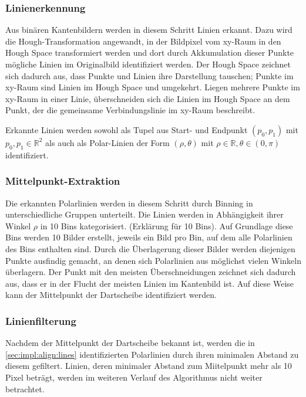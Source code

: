 \subsubsection{Linienerkennung}
\label{sec:impl:align:lines}

Aus binären Kantenbildern werden in diesem Schritt Linien erkannt. Dazu wird die Hough-Transformation angewandt, in der Bildpixel vom xy-Raum in den Hough Space transformiert werden und dort durch Akkumulation dieser Punkte mögliche Linien im Originalbild identifiziert werden. Der Hough Space zeichnet sich dadurch aus, dass Punkte und Linien ihre Darstellung tauschen; Punkte im xy-Raum sind Linien im Hough Space und umgekehrt. Liegen mehrere Punkte im xy-Raum in einer Linie, überschneiden sich die Linien im Hough Space an dem Punkt, der die gemeinsame Verbindungslinie im xy-Raum beschreibt.

Erkannte Linien werden sowohl als Tupel aus Start- und Endpunkt $ (p_0, p_1) $ mit $ p_0, p_1 \in \mathbb{R}^2 $ als auch als Polar-Linien der Form $ (\rho, \theta) $ mit $ \rho \in \mathbb{R}, \theta \in (0, \pi) $ identifiziert.

\subsubsection{Mittelpunkt-Extraktion}
\label{sec:impl:align:center}

Die erkannten Polarlinien werden in diesem Schritt durch Binning in unterschiedliche Gruppen unterteilt. Die Linien werden in Abhängigkeit ihrer Winkel $\rho$ in 10 Bins kategorisiert. (Erklärung für 10 Bins).
Auf Grundlage diese Bins werden 10 Bilder erstellt, jeweils ein Bild pro Bin, auf dem alle Polarlinien des Bins enthalten sind. Durch die Überlagerung dieser Bilder werden diejenigen Punkte ausfindig gemacht, an denen sich Polarlinien aus möglichst vielen Winkeln überlagern. Der Punkt mit den meisten Überschneidungen zeichnet sich dadurch aus, dass er in der Flucht der meisten Linien im Kantenbild ist. Auf diese Weise kann der Mittelpunkt der Dartscheibe identifiziert werden.

\subsubsection{Linienfilterung}
\label{sec:impl:align:line_filter}

Nachdem der Mittelpunkt der Dartscheibe bekannt ist, werden die in \autoref{sec:impl:align:lines} identifizierten Polarlinien durch ihren minimalen Abstand zu diesem gefiltert. Linien, deren minimaler Abstand zum Miitelpunkt mehr als 10 Pixel beträgt, werden im weiteren Verlauf des Algorithmus nicht weiter betrachtet.

